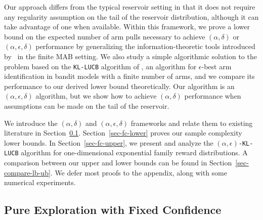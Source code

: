 Our approach
differs from the typical reservoir setting in that it does not require any
regularity assumption on the tail of the reservoir distribution,
although it can take advantage of one when available.
Within this framework, we prove a lower bound on the expected number
of arm pulls necessary to achieve $(\alpha,\delta)$
or $(\alpha,\epsilon,\delta)$
performance by generalizing the information-theoretic tools introduced
by~\cite{JMLR15}
in the finite MAB setting.  We also study
a simple algorithmic solution to the problem based on 
the \texttt{KL-LUCB} algorithm of \cite{COLT13}, an
algorithm for $\epsilon$-best arm identification in bandit models with a finite
number of arms, and we compare its performance to our derived
lower bound theoretically.
Our algorithm is an $(\alpha, \epsilon, \delta)$ algorithm,
but we show how to achieve $(\alpha,\delta)$ performance
when assumptions can be made on the tail of the reservoir.

We introduce
the $(\alpha,\delta)$ and $(\alpha, \epsilon, \delta)$ frameworks and relate
them to existing literature in Section~\ref{sec-prelim}.
Section~\ref{sec-fc-lower} proves our sample complexity lower bounds.
In  Section~\ref{sec-fc-upper}, we present and analyze the \texttt{$(\alpha,\epsilon)$-KL-LUCB} algorithm for one-dimensional exponential family reward distributions.
A comparison between our upper and lower bounds can be found in Section~\ref{sec-compare-lb-ub}.
We defer most proofs to the appendix, along with some
numerical experiments.



%
%
\subsection{Pure Exploration with Fixed Confidence}\label{sec-prelim}

